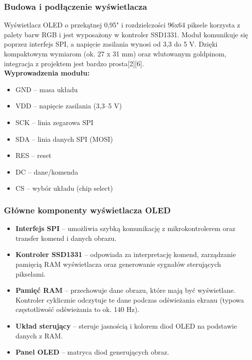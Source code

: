 \documentclass[a4paper,12pt]{report}
\begin{document}
\subsubsection*{Budowa i podłączenie wyświetlacza}

Wyświetlacz OLED o przekątnej 0,95" i rozdzielczości 96x64 piksele korzysta z palety barw RGB i jest wyposażony w kontroler SSD1331. Moduł komunikuje się poprzez interfejs SPI, a napięcie zasilania wynosi od 3,3 do 5 V. Dzięki kompaktowym wymiarom (ok. 27 x 31 mm) oraz wlutowanym goldpinom, integracja z projektem jest bardzo prosta[2][6].\\

\textbf{Wyprowadzenia modułu:}
\begin{itemize}
    \item GND – masa układu
    \item VDD – napięcie zasilania (3,3–5 V)
    \item SCK – linia zegarowa SPI
    \item SDA – linia danych SPI (MOSI)
    \item RES – reset
    \item DC – dane/komenda
    \item CS – wybór układu (chip select)
\end{itemize}

\subsubsection*{Główne komponenty wyświetlacza OLED}

\begin{itemize}
    \item \textbf{Interfejs SPI} – umożliwia szybką komunikację z mikrokontrolerem oraz transfer komend i danych obrazu.
    \item \textbf{Kontroler SSD1331} – odpowiada za interpretację komend, zarządzanie pamięcią RAM wyświetlacza oraz generowanie sygnałów sterujących pikselami.
    \item \textbf{Pamięć RAM} – przechowuje dane obrazu, które mają być wyświetlane. Kontroler cyklicznie odczytuje te dane podczas odświeżania ekranu (typowa częstotliwość odświeżania to ok. 140 Hz).
    \item \textbf{Układ sterujący} – steruje jasnością i kolorem diod OLED na podstawie danych z RAM.
    \item \textbf{Panel OLED} – matryca diod generujących obraz.
\end{itemize}
\end{document}
